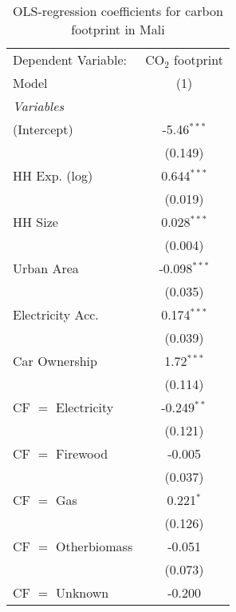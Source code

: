 
\begin{table}[htbp!]
   \centering
   \small
   \begin{adjustbox}{width = 1\textwidth, max height = 0.95\textheight, center}
      \begin{threeparttable}[b]
         \caption{\label{tab:OLS_2_MLI} OLS-regression coefficients for carbon footprint in Mali}
         \begin{tabular}{lc}
            \tabularnewline \midrule \midrule
            Dependent Variable: & CO$_{2}$ footprint\\  
            Model               & (1)\\  
            \midrule
            \emph{Variables}\\
            (Intercept)         & -5.46$^{***}$\\   
                                & (0.149)\\   
            HH Exp. (log)       & 0.644$^{***}$\\   
                                & (0.019)\\   
            HH Size             & 0.028$^{***}$\\   
                                & (0.004)\\   
            Urban Area          & -0.098$^{***}$\\   
                                & (0.035)\\   
            Electricity Acc.    & 0.174$^{***}$\\   
                                & (0.039)\\   
            Car Ownership       & 1.72$^{***}$\\   
                                & (0.114)\\   
            CF $=$ Electricity  & -0.249$^{**}$\\   
                                & (0.121)\\   
            CF $=$ Firewood     & -0.005\\   
                                & (0.037)\\   
            CF $=$ Gas          & 0.221$^{*}$\\   
                                & (0.126)\\   
            CF $=$ Otherbiomass & -0.051\\   
                                & (0.073)\\   
            CF $=$ Unknown      & -0.200\\   

\end{tabular}
\end{threeparttable}
\end{adjustbox}
\end{table}
